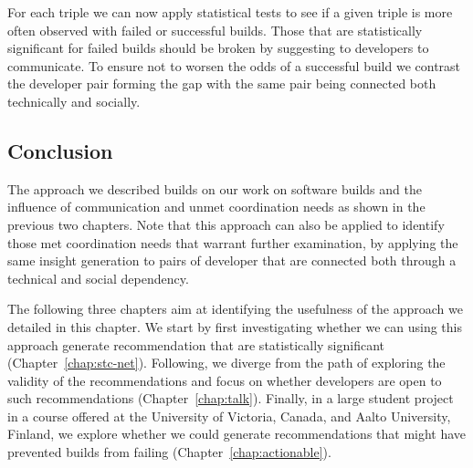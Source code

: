 For each triple we can now apply statistical tests to see if a given triple is more often observed with failed or successful builds.
Those that are statistically significant for failed builds should be broken by suggesting to developers to communicate.
To ensure not to worsen the odds of a successful build we contrast the developer pair forming the gap with the same pair being connected both technically and socially.

\subsection{Conclusion}
The approach we described builds on our work on software builds and the influence of communication and unmet coordination needs as shown in the previous two chapters.
Note that this approach can also be applied to identify those met coordination needs that warrant further examination, by applying the same insight generation to pairs of developer that are connected both through a technical and social dependency.

The following three chapters aim at identifying the usefulness of the approach we detailed in this chapter.
We start by first investigating whether we can using this approach generate recommendation that are statistically significant (Chapter~\ref{chap:stc-net}).
Following, we diverge from the path of exploring the validity of the recommendations and focus on whether developers are open to such recommendations (Chapter~\ref{chap:talk}).
Finally, in a large student project in a course offered at the University of Victoria, Canada, and Aalto University, Finland, we explore whether we could generate recommendations that might have prevented builds from failing (Chapter~\ref{chap:actionable}).